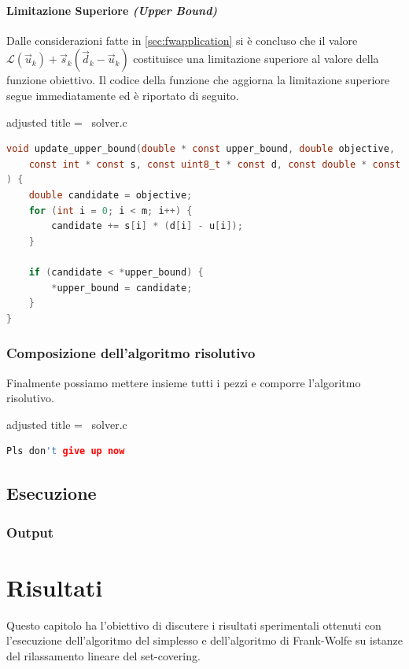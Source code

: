 \subsubsection{Limitazione Superiore \textit{(Upper Bound)}}
Dalle considerazioni fatte in \ref{sec:fwapplication} si è concluso che il valore
\(
    \mathcal{L}(\vec{u}_k) + \vec{s}_k(\vec{d}_k - \vec{u}_k)
\)
costituisce una limitazione superiore al valore della funzione obiettivo. Il codice della funzione che aggiorna la
limitazione superiore segue immediatamente ed è riportato di seguito.

\begin{code}{adjusted title = {\cicon\ solver.c}}
\begin{lstlisting}[language=c, style = style, caption={Aggiornamento della limitazione superiore.}]
void update_upper_bound(double * const upper_bound, double objective,
    const int * const s, const uint8_t * const d, const double * const u
) {
    double candidate = objective;
    for (int i = 0; i < m; i++) {
        candidate += s[i] * (d[i] - u[i]);
    }

    if (candidate < *upper_bound) {
        *upper_bound = candidate;
    }
}
\end{lstlisting}
\end{code}

\subsection{Composizione dell'algoritmo risolutivo}
Finalmente possiamo mettere insieme tutti i pezzi e comporre l'algoritmo risolutivo.
\begin{code}{adjusted title = {\cicon\ solver.c}}
\begin{lstlisting}[language=c, style = style, caption={Implementazione dell'algoritmo risolutivo.}]
Pls don't give up now
\end{lstlisting}
\end{code}
\newpage

\section{Esecuzione}

\subsection{Output}

\chapter{Risultati}
Questo capitolo ha l'obiettivo di discutere i risultati sperimentali ottenuti con l'esecuzione
dell'algoritmo del simplesso e dell'algoritmo di Frank-Wolfe su istanze del rilassamento lineare del set-covering.


